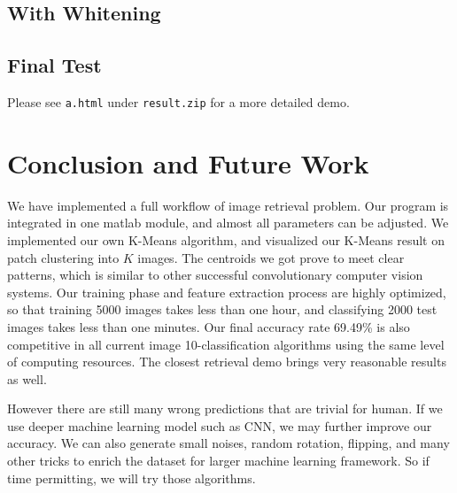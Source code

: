 \documentclass{acm_proc_article-sp}
\begin{document}
\subsection{With Whitening}

\subsection{Final Test}

Please see \texttt{a.html} under \texttt{result.zip} for a more detailed demo.

\section{Conclusion and Future Work}
We have implemented a full workflow of image retrieval problem. Our program is
integrated in one matlab module, and almost all parameters can be adjusted. We
implemented our own K-Means algorithm, and visualized our K-Means result on
patch clustering into $K$ images. The centroids we got prove to meet clear
patterns, which is similar to other successful convolutionary computer vision
systems. Our training phase and feature extraction process are highly
optimized, so that training 5000 images takes less than one hour, and
classifying 2000 test images takes less than one minutes. Our final accuracy
rate 69.49\% is also competitive in all current image 10-classification
algorithms using the same level of computing resources. The closest retrieval
demo brings very reasonable results as well.

However there are still many wrong predictions that are trivial for human. If
we use deeper machine learning model such as CNN, we may further improve our
accuracy. We can also generate small noises, random rotation, flipping, and
many other tricks to enrich the dataset for larger machine learning framework.
So if time permitting, we will try those algorithms.

\nocite{*}

 

\balancecolumns{}
\end{document}
